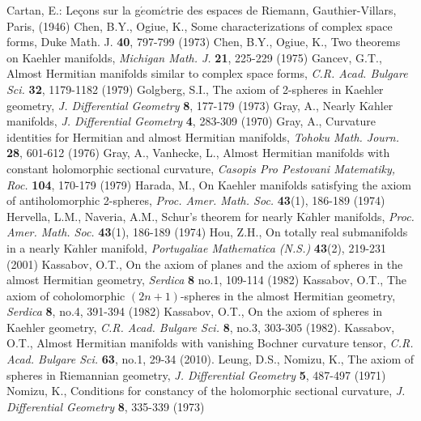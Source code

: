 \documentclass{amsart}
\newtheorem*{theorem A}{Theorem A}
\newtheorem*{theorem B}{N\"olker's Theorem}
\theoremstyle{remark}
\theoremstyle{remark}
\theoremstyle{definition}
\numberwithin{equation}{section}
\begin{document}
\begin{thebibliography}{99}

Cartan, E.: Le\c cons sur la g$\acute{e}$om$\acute{e}$trie des espaces de Riemann, Gauthier-Villars, Paris, (1946)
Chen, B.Y.,  Ogiue, K., Some characterizations of complex space forms, Duke Math. J.
\textbf{40}, 797-799 (1973)
Chen, B.Y.,  Ogiue, K., Two theorems on Kaehler manifolds, \emph{Michigan Math. J.}
\textbf{21}, 225-229 (1975)
Gancev, G.T., Almost Hermitian manifolds similar to complex space forms, \emph{C.R. Acad. Bulgare Sci.}
\textbf{32}, 1179-1182 (1979)
Golgberg, S.I., The axiom of 2-spheres in Kaehler geometry, \emph{J. Differential Geometry}
\textbf{8}, 177-179 (1973)
Gray, A., Nearly K$\ddot{a}$hler manifolds, \emph{J. Differential Geometry}
\textbf{4}, 283-309  (1970)
Gray, A., Curvature identities for Hermitian and almost Hermitian manifolds, \emph{Tohoku Math. Journ.}
\textbf{28}, 601-612 (1976)
Gray, A., Vanhecke, L., Almost Hermitian manifolds with constant holomorphic sectional curvature, \emph{Casopis Pro Pestovani Matematiky, Roc.}
\textbf{104}, 170-179 (1979)
Harada, M., On Kaehler manifolds satisfying the axiom of antiholomorphic 2-spheres, \emph{Proc. Amer. Math. Soc.}
\textbf{43}(1), 186-189 (1974)
Hervella, L.M., Naveria, A.M., Schur's theorem for nearly K$\ddot{a}$hler manifolds, \emph{Proc. Amer. Math. Soc.}
\textbf{43}(1), 186-189 (1974)
Hou, Z.H., On totally real submanifolds in a nearly K$\ddot{a}$hler manifold, \emph{Portugaliae Mathematica (N.S.)}
\textbf{43}(2), 219-231 (2001)
Kassabov, O.T., On the axiom of planes and the axiom of spheres in the almost Hermitian geometry, \emph{Serdica}
\textbf{8} no.1,  109-114  (1982)
Kassabov, O.T., The axiom of coholomorphic $(2n+1)$-spheres in the almost Hermitian geometry, \emph{Serdica}
\textbf{8}, no.4, 391-394 (1982)
Kassabov, O.T., On the axiom of spheres in Kaehler geometry, \emph{C.R. Acad. Bulgare Sci.}
\textbf{8}, no.3, 303-305  (1982).
Kassabov, O.T., Almost Hermitian manifolds with vanishing Bochner curvature tensor, \emph{C.R. Acad. Bulgare Sci.}
\textbf{63}, no.1, 29-34  (2010).
Leung,  D.S., Nomizu, K., The axiom of spheres in Riemannian geometry, \emph{J. Differential Geometry}
\textbf{5}, 487-497 (1971)
Nomizu, K., Conditions for constancy of the holomorphic sectional curvature, \emph{J. Differential Geometry}
\textbf{8}, 335-339 (1973)

\end{thebibliography}
\end{document}
